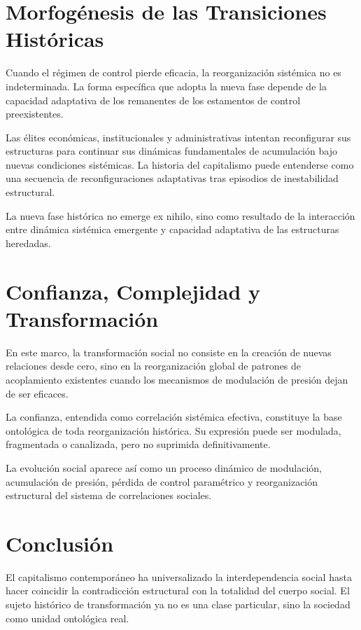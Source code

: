 \documentclass[12pt,a4paper]{article}
\begin{document}
\section{Morfogénesis de las Transiciones Históricas}

Cuando el régimen de control pierde eficacia, la reorganización sistémica no es
indeterminada. La forma específica que adopta la nueva fase depende de la capacidad
adaptativa de los remanentes de los estamentos de control preexistentes.

Las élites económicas, institucionales y administrativas intentan reconfigurar sus
estructuras para continuar sus dinámicas fundamentales de acumulación bajo nuevas
condiciones sistémicas. La historia del capitalismo puede entenderse como una
secuencia de reconfiguraciones adaptativas tras episodios de inestabilidad estructural.

La nueva fase histórica no emerge ex nihilo, sino como resultado de la interacción
entre dinámica sistémica emergente y capacidad adaptativa de las estructuras
heredadas.

\section{Confianza, Complejidad y Transformación}

En este marco, la transformación social no consiste en la creación de nuevas
relaciones desde cero, sino en la reorganización global de patrones de acoplamiento
existentes cuando los mecanismos de modulación de presión dejan de ser eficaces.

La confianza, entendida como correlación sistémica efectiva, constituye la base
ontológica de toda reorganización histórica. Su expresión puede ser modulada,
fragmentada o canalizada, pero no suprimida definitivamente.

La evolución social aparece así como un proceso dinámico de modulación, acumulación
de presión, pérdida de control paramétrico y reorganización estructural del sistema
de correlaciones sociales.

\section{Conclusión}

El capitalismo contemporáneo ha universalizado la interdependencia social hasta hacer coincidir la contradicción estructural con la totalidad del cuerpo social. El sujeto histórico de transformación ya no es una clase particular, sino la sociedad como unidad ontológica real.
\end{document}
